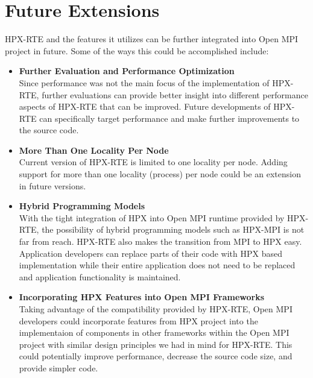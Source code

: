 \section{Future Extensions}
HPX-RTE and the features it utilizes can be further integrated into Open MPI project in future. Some of the ways this could be accomplished include:

\begin{itemize}

\item \textbf{Further Evaluation and Performance Optimization}\\
Since performance was not the main focus of the implementation of HPX-RTE, further evaluations can provide better insight into different performance aspects of HPX-RTE that can be improved. Future developments of HPX-RTE can specifically target performance and make further improvements to the source code. 

\item \textbf{More Than One Locality Per Node}\\
Current version of HPX-RTE is limited to one locality per node. Adding support for more than one locality (process) per node could be an extension in future versions.

\item \textbf{Hybrid Programming Models}\\
With the tight integration of HPX into Open MPI runtime provided by HPX-RTE, the possibility of hybrid programming models such as HPX-MPI is not far from reach. HPX-RTE also makes the transition from MPI to HPX easy. Application developers can replace parts of their code with HPX based implementation while their entire application does not need to be replaced and application functionality is maintained.

\item \textbf{Incorporating HPX Features into Open MPI Frameworks}\\
Taking advantage of the compatibility provided by HPX-RTE, Open MPI developers could incorporate features from HPX project into the implementaion of components in other frameworks within the Open MPI project with similar design principles we had in mind for HPX-RTE. This could potentially improve performance, decrease the source code size, and provide simpler code.    
\end{itemize}


